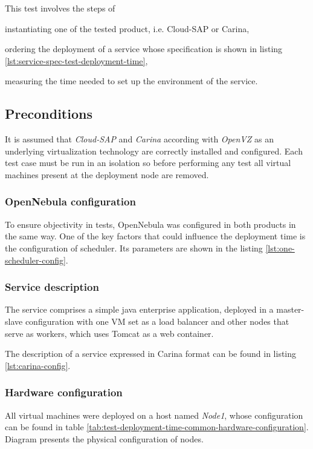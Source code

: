 This test involves the steps of
  \begin{inparaenum}[i)]
    \item instantiating one of the tested product, i.e. Cloud-SAP or Carina,
    \item ordering the deployment of a service whose specification is shown in listing \ref{lst:service-spec-test-deployment-time},
    \item measuring the time needed to set up the environment of the service.
  \end{inparaenum}

\subsection*{Preconditions}
It is assumed that \emph{Cloud-SAP} and \emph{Carina} according with \emph{OpenVZ} as an underlying virtualization technology are correctly installed and configured.
Each test case must be run in an isolation so before performing any test all virtual machines present at the deployment node are removed.
\subsubsection{OpenNebula configuration}
To ensure objectivity in tests, OpenNebula was configured in both products in the same way. One of the key factors that could influence the deployment time is the configuration of scheduler. Its parameters are shown in the listing \ref{lst:one-scheduler-config}.

\subsubsection{Service description}
The service comprises a simple java enterprise application, deployed in a master-slave configuration with one VM set as a load balancer and other nodes that serve as workers, which uses Tomcat as a web container.

The description of a service expressed in Carina format can be found in listing \ref{lst:carina-config}.

\subsubsection{Hardware configuration}

All virtual machines were deployed on a host named \emph{Node1}, whose configuration can be found in table \ref{tab:test-deployment-time-common-hardware-configuration}. Diagram presents the physical configuration of nodes.

